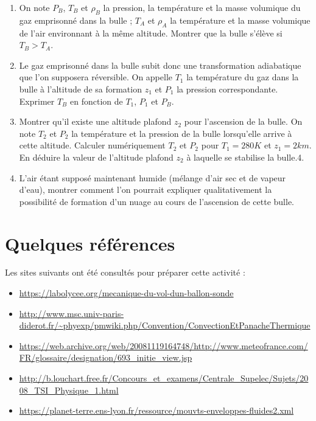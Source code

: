 \documentclass[letterpaper]{article}
\begin{document}
\begin{enumerate}
\item On note \(P_B\), \(T_B\) et \(\rho_B\) la pression, la température et la masse volumique du gaz emprisonné dans la bulle ; \(T_A\) et \(\rho_A\) la température et la masse volumique de l'air environnant à la même altitude. Montrer que la bulle s'élève si \(T_B > T_A\).

\item Le gaz emprisonné dans la bulle subit donc une transformation adiabatique que l'on supposera réversible. On appelle \(T_1\) la température du gaz dans la bulle à l'altitude de sa formation \(z_1\) et \(P_1\) la pression correspondante. Exprimer \(T_B\) en fonction de \(T_1\), \(P_1\) et \(P_B\).

\item Montrer qu'il existe une altitude plafond \(z_2\) pour l'ascension de la bulle. On note \(T_2\) et \(P_2\) la température et la pression de la bulle lorsqu'elle arrive à cette altitude. Calculer numériquement \(T_2\) et \(P_2\) pour \(T_1 = 280 K\) et \(z_1 = 2 km\). En déduire la valeur de l'altitude plafond \(z_2\) à laquelle se stabilise la bulle.4.

\item L'air étant supposé maintenant humide (mélange d'air sec et de vapeur d'eau), montrer comment l'on pourrait expliquer qualitativement la possibilité de formation d'un nuage au cours de l'ascension de cette bulle.
\end{enumerate}


\newpage

\section{Quelques références}
\label{sec:org5a0fb81}


Les sites suivants ont été consultés pour préparer cette activité : 

\begin{itemize}
\item \url{https://labolycee.org/mecanique-du-vol-dun-ballon-sonde}

\item \url{http://www.msc.univ-paris-diderot.fr/\~phyexp/pmwiki.php/Convention/ConvectionEtPanacheThermique}

\item \url{https://web.archive.org/web/20081119164748/http://www.meteofrance.com/FR/glossaire/designation/693\_initie\_view.jsp}

\item \url{http://b.louchart.free.fr/Concours\_et\_examens/Centrale\_Supelec/Sujets/2008\_TSI\_Physique\_1.html}

\item \url{https://planet-terre.ens-lyon.fr/ressource/mouvts-enveloppes-fluides2.xml}
\end{itemize}
\end{document}
